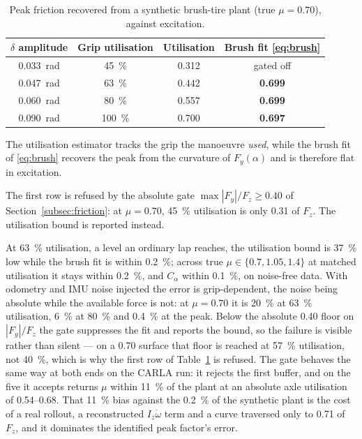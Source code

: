 \begin{table}[t]
\caption{Peak friction recovered from a synthetic brush-tire plant (true $\mu=0.70$), against excitation.}
\label{tab:mu}
\centering
\begin{threeparttable}
\small
\begin{tabular}{@{}cccc@{}}
\toprule
$\delta$ amplitude & Grip utilisation & Utilisation & Brush fit
\eqref{eq:brush}\\
\midrule
\SI{0.033}{\radian} & \SI{45}{\percent}  & 0.312 & gated off\\
\SI{0.047}{\radian} & \SI{63}{\percent}  & 0.442 & \textbf{0.699}\\
\SI{0.060}{\radian} & \SI{80}{\percent}  & 0.557 & \textbf{0.699}\\
\SI{0.090}{\radian} & \SI{100}{\percent} & 0.700 & \textbf{0.697}\\
\bottomrule
\end{tabular}
\begin{tablenotes}[flushleft]\scriptsize
\item The utilisation estimator tracks the grip the manoeuvre \emph{used},
while the brush fit of \eqref{eq:brush} recovers the peak from the curvature
of $F_{y}(\alpha)$ and is therefore flat in excitation.
\item The first row is refused by the absolute gate
$\max|F_{y}|/F_{z}\ge\num{0.40}$ of Section~\ref{subsec:friction}: at
$\mu=0.70$, \SI{45}{\percent} utilisation is only \num{0.31} of $F_{z}$. The
utilisation bound is reported instead.
\end{tablenotes}
\end{threeparttable}
\end{table}

At \SI{63}{\percent} utilisation, a level an ordinary lap reaches, the
utilisation bound is \SI{37}{\percent} low while the brush fit is within
\SI{0.2}{\percent}; across true $\mu\in\{0.7,1.05,1.4\}$ at matched utilisation
it stays within \SI{0.2}{\percent}, and $C_{\alpha}$ within \SI{0.1}{\percent},
on noise-free data. With odometry and IMU noise injected the error is
grip-dependent, the noise being absolute while the available force is not: at
$\mu=0.70$ it is \SI{20}{\percent} at \SI{63}{\percent} utilisation,
\SI{6}{\percent} at \SI{80}{\percent} and \SI{0.4}{\percent} at the peak. Below
the absolute \num{0.40} floor on $|F_{y}|/F_{z}$ the gate suppresses the fit
and reports the bound, so the failure is visible rather than silent --- on a
\num{0.70} surface that floor is reached at \SI{57}{\percent} utilisation, not
\SI{40}{\percent}, which is why the first row of Table~\ref{tab:mu} is refused.
The gate behaves the same way at both ends on the CARLA run: it rejects the
first buffer, and on the five it accepts returns $\mu$ within
\SI{11}{\percent} of the plant at an absolute axle utilisation of
\numrange{0.54}{0.68}. That \SI{11}{\percent} bias against the
\SI{0.2}{\percent} of the synthetic plant is the cost of a real rollout, a
reconstructed $I_{z}\dot\omega$ term and a curve traversed only to \num{0.71}
of $F_{z}$, and it dominates the identified peak factor's error.

